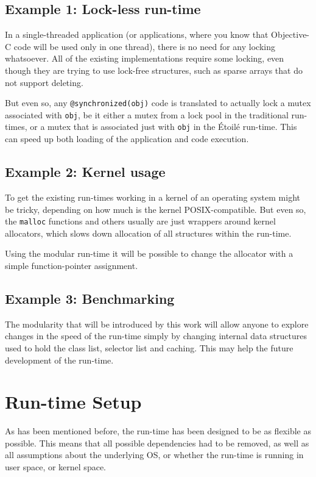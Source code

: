 \subsection{Example 1: Lock-less run-time}
In a single-threaded application (or applications, where you know that Objective-C code will be used only in one thread), there is no need for any locking whatsoever. All of the existing implementations require some locking, even though they are trying to use lock-free structures, such as sparse arrays that do not support deleting.

But even so, any \verb=@synchronized(obj)= code is translated to actually lock a mutex associated with \verb=obj=, be it either a mutex from a lock pool in the traditional run-times, or a mutex that is associated just with \verb=obj= in the \'Etoil\'e run-time. This can speed up both loading of the application and code execution.

\subsection{Example 2: Kernel usage}

To get the existing run-times working in a kernel of an operating system might be tricky, depending on how much is the kernel POSIX-compatible. But even so, the \verb=malloc= functions and others usually are just wrappers around kernel allocators, which slows down allocation of all structures within the run-time.

Using the modular run-time it will be possible to change the allocator with a simple function-pointer assignment.


\subsection{Example 3: Benchmarking}

The modularity that will be introduced by this work will allow anyone to explore changes in the speed of the run-time simply by changing internal data structures used to hold the class list, selector list and caching. This may help the future development of the run-time.


\section{Run-time Setup}

As has been mentioned before, the run-time has been designed to be as flexible as possible. This means that all possible dependencies had to be removed, as well as all assumptions about the underlying OS, or whether the run-time is running in user space, or kernel space.

